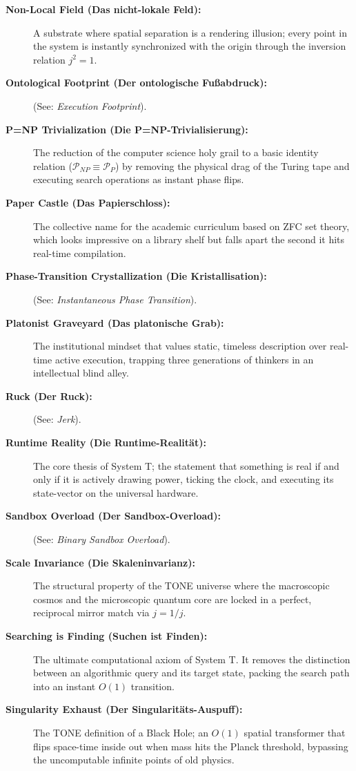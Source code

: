 \documentclass[11pt,a4paper]{article}
\begin{document}
\begin{description}
\item[\textbf{Non-Local Field (Das nicht-lokale Feld):}] A substrate where spatial separation is a rendering illusion; every point in the system is instantly synchronized with the origin through the inversion relation $j^2=1$.
\item[\textbf{Ontological Footprint (Der ontologische Fußabdruck):}] (See: \textit{Execution Footprint}).
\item[\textbf{P=NP Trivialization (Die P=NP-Trivialisierung):}] The reduction of the computer science holy grail to a basic identity relation ($\mathcal{P}_{NP} \equiv \mathcal{P}_P$) by removing the physical drag of the Turing tape and executing search operations as instant phase flips.
\item[\textbf{Paper Castle (Das Papierschloss):}] The collective name for the academic curriculum based on ZFC set theory, which looks impressive on a library shelf but falls apart the second it hits real-time compilation.
\item[\textbf{Phase-Transition Crystallization (Die Kristallisation):}] (See: \textit{Instantaneous Phase Transition}).
\item[\textbf{Platonist Graveyard (Das platonische Grab):}] The institutional mindset that values static, timeless description over real-time active execution, trapping three generations of thinkers in an intellectual blind alley.
\item[\textbf{Ruck (Der Ruck):}] (See: \textit{Jerk}).
\item[\textbf{Runtime Reality (Die Runtime-Realität):}] The core thesis of System T; the statement that something is real if and only if it is actively drawing power, ticking the clock, and executing its state-vector on the universal hardware.
\item[\textbf{Sandbox Overload (Der Sandbox-Overload):}] (See: \textit{Binary Sandbox Overload}).
\item[\textbf{Scale Invariance (Die Skaleninvarianz):}] The structural property of the TONE universe where the macroscopic cosmos and the microscopic quantum core are locked in a perfect, reciprocal mirror match via $j = 1/j$.
\item[\textbf{Searching is Finding (Suchen ist Finden):}] The ultimate computational axiom of System T. It removes the distinction between an algorithmic query and its target state, packing the search path into an instant $O(1)$ transition.
\item[\textbf{Singularity Exhaust (Der Singularitäts-Auspuff):}] The TONE definition of a Black Hole; an $O(1)$ spatial transformer that flips space-time inside out when mass hits the Planck threshold, bypassing the uncomputable infinite points of old physics.

\end{description}
\end{document}
